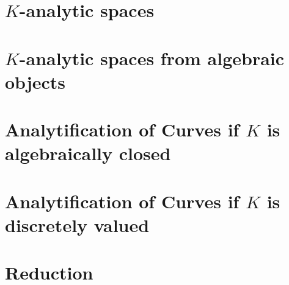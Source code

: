 \section{$K$-analytic spaces} \label{sec:K_analytic_spaces}



\section{$K$-analytic spaces from algebraic objects} \label{sec:berkovich_analytification_of_schemes}



\section{Analytification of Curves if $K$ is algebraically closed} \label{sec:analytification_of_curves}



\section{Analytification of Curves if $K$ is discretely valued} \label{sec:analytification_of_curves_discretely_valued}

\section{Reduction} \label{sec:reduction}



\section{} \label{sec:}

